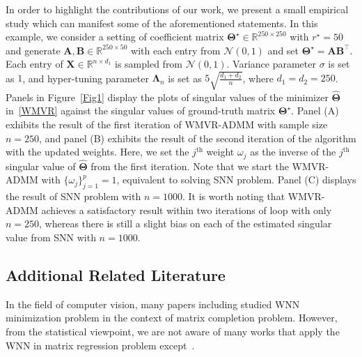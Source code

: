 \documentclass[12pt]{article}
\begin{document}
In order to highlight the contributions of our work, we present a small empirical study which can manifest some of the aforementioned statements.
In this example, we consider a setting of coefficient matrix $\boldsymbol{\Theta}^{\star}\in\mathbb{R}^{250 \times 250}$ with $r^{\star}=50$ and generate $\boldsymbol{A}, \boldsymbol{B} \in \mathbb{R}^{250 \times 50}$ with each entry from $\mathcal{N}(0,1)$ and set $\boldsymbol{\Theta}^{\star}=\boldsymbol{AB^{\top}}$.
Each entry of $\boldsymbol{X}\in\mathbb{R}^{n \times d_{1}}$ is sampled from $\mathcal{N}(0,1)$.
Variance parameter $\sigma$ is set as $1$, and hyper-tuning parameter $\boldsymbol{\Lambda}_{n}$ is set as $5\sqrt{\frac{d_{1}+d_{2}}{n}}$, where $d_{1}=d_{2}=250$.
Panels in Figure~\ref{Fig1} display the plots of singular values of the minimizer $\widehat{\boldsymbol{\Theta}}$ in~\eqref{WMVR} against the singular values of ground-truth matrix $\boldsymbol{\Theta^{\star}}$.
Panel (A) exhibits the result of the first iteration of WMVR-ADMM with sample size $n=250$, and panel (B) exhibits the result of the second iteration of the algorithm with the updated weights.
Here, we set the $j^{\text{th}}$ weight $\omega_{j}$ as the inverse of the $j^{\text{th}}$ singular value of $\widehat{\boldsymbol{\Theta}}$ from the first iteration. 
Note that we start the WMVR-ADMM with $\{\omega_{j}\}_{j=1}^{p}=1$, equivalent to solving SNN problem.
Panel (C) displays the result of SNN problem with $n=1000$.
It is worth noting that WMVR-ADMM achieves a satisfactory result within two iterations of loop with only $n=250$, whereas there is still a slight bias on each of the estimated singular value from SNN with $n=1000$.

\subsection{Additional Related Literature}
In the field of computer vision, many papers including \citet{gu2014weighted,gu2017weighted,xu2017multi,yair2018multi,liu2018speckle,kim2020cauchy} studied WNN minimization problem in the context of matrix completion problem.
However, from the statistical viewpoint, we are not aware of many works that apply the WNN in matrix regression problem except~\citet{chen2013reduced}.
\end{document}
